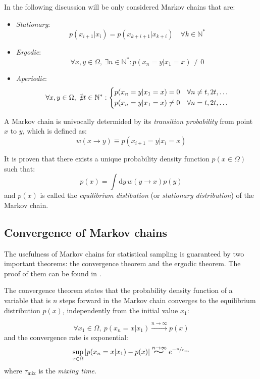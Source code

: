 In the following discussion will be only considered Markov chains that are:
\begin{itemize}
    \item \emph{Stationary}:
        \[
            p(x_{i+1}|x_i) = p(x_{k+i+1}|x_{k+i}) \quad \forall k\in\mathbb N^*
        \]
    \item \emph{Ergodic}:
        \[
            \forall x,y \in \Omega,\ \exists n\in\mathbb N^* : p(x_n=y|x_1=x) \neq 0
        \]
    \item \emph{Aperiodic}:
        \[
            \forall x,y \in \Omega,\ \nexists t\in\mathbb N^* :
            \begin{dcases}
                p(x_n=y|x_1=x)=0 \quad \forall n\neq t,2t,\ldots \\
                p(x_n=y|x_1=x)\neq0 \quad \forall n=t,2t,\ldots
            \end{dcases}
        \]
\end{itemize}

A Markov chain is univocally determided by its \emph{transition probability} from point $x$ to $y$, which is defined as:
\begin{equation}\label{eq:transition}
    w(x \to y) \equiv p(x_{i+1}=y|x_i=x)
\end{equation}

It is proven \cite{mc-mt} that there exists a unique probability density function $p(x\in\Omega)$
such that:
\begin{equation}\label{eq:equilibrium}
	p(x) = \int\mathrm dy\,w(y \to x)p(y)
\end{equation}
and $p(x)$ is called the \emph{equilibrium distibution} (or \emph{stationary distribution}) of the Markov chain.

\subsection*{Convergence of Markov chains}
The usefulness of Markov chains for statistical sampling is guaranteed by two important theorems:
the convergence theorem and the ergodic theorem. The proof of them can be found in \cite{mc-mt}.

The convergence theorem states that the probability density function of a variable that is $n$ steps forward in the Markov chain
converges to the equilibrium distribution $p(x)$, independently from the initial value $x_1$:
\begin{theorem}\label{th:convergence}
    \[
        \forall x_1 \in \Omega,\ p(x_{n}=x|x_1) \xrightarrow{n\to\infty} p(x)
    \]
    and the convergence rate is exponential:
    \[
        \sup_{x\in\Omega} |p(x_n=x|x_1) - p(x)| \stackrel{n\to\infty}{\scalebox{2}[1.25]{$\sim$}} e^{-\sfrac{n}{\tau_\mathrm{mix}}}
    \]
    where $\tau_\mathrm{mix}$ is the \emph{mixing time}.
\end{theorem}

